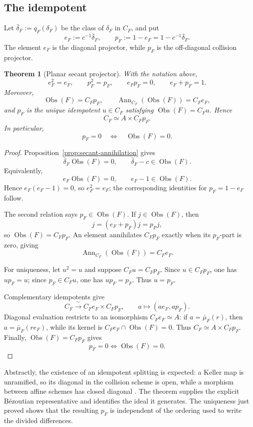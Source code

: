 \documentclass[11pt]{article}
\newtheorem{theorem}{Theorem}[section]
\newcommand{\Obs}{\operatorname{Obs}}
\begin{document}
\subsection{The idempotent}

Let \(\bar\delta_F:=q_F(\delta_F)\) be the class of \(\delta_F\) in
\(C_F\), and put
\[
  e_F:=c^{-1}\bar\delta_F,\qquad
  p_F:=1-e_F=1-c^{-1}\bar\delta_F.
\]
The element \(e_F\) is the diagonal projector, while \(p_F\) is the
off-diagonal collision projector.

\begin{theorem}[Planar secant projector]
\label{thm:planar-secant-projector}
With the notation above,
\[
  e_F^2=e_F,\qquad
  p_F^2=p_F,\qquad
  e_Fp_F=0,\qquad
  e_F+p_F=1.
\]
Moreover,
\[
  \Obs(F)=C_Fp_F,\qquad
  \operatorname{Ann}_{C_F}(\Obs(F))=C_Fe_F,
\]
and \(p_F\) is the unique idempotent \(u\in C_F\) satisfying
\(\Obs(F)=C_Fu\).  Hence
\[
  C_F\simeq A\times C_Fp_F.
\]
In particular,
\[
  p_F=0\quad\Longleftrightarrow\quad\Obs(F)=0.
\]
\end{theorem}

\begin{proof}
Proposition~\ref{prop:secant-annihilation} gives
\[
  \bar\delta_F\Obs(F)=0,\qquad
  \bar\delta_F-c\in\Obs(F).
\]
Equivalently,
\[
  e_F\Obs(F)=0,\qquad e_F-1\in\Obs(F).
\]
Hence \(e_F(e_F-1)=0\), so \(e_F^2=e_F\); the corresponding identities
for \(p_F=1-e_F\) follow.

The second relation says \(p_F\in\Obs(F)\).  If
\(j\in\Obs(F)\), then
\[
  j=(e_F+p_F)j=p_Fj,
\]
so \(\Obs(F)=C_Fp_F\).  An element annihilates \(C_Fp_F\) exactly when its
\(p_F\)-part is zero, giving
\[
  \operatorname{Ann}_{C_F}(\Obs(F))=C_Fe_F.
\]

For uniqueness, let \(u^2=u\) and suppose \(C_Fu=C_Fp_F\).  Since
\(u\in C_Fp_F\), one has \(up_F=u\); since \(p_F\in C_Fu\), one has
\(up_F=p_F\).  Thus \(u=p_F\).

Complementary idempotents give
\[
  C_F\xrightarrow{\ \sim\ }C_Fe_F\times C_Fp_F,\qquad
  a\longmapsto(ae_F,ap_F).
\]
Diagonal evaluation restricts to an isomorphism \(C_Fe_F\simeq A\):
if \(a=\bar\mu_F(r)\), then \(a=\bar\mu_F(re_F)\), while its kernel is
\(C_Fe_F\cap\Obs(F)=0\).  Thus \(C_F\simeq A\times C_Fp_F\).
Finally, \(\Obs(F)=C_Fp_F\) gives
\[
  p_F=0\Longleftrightarrow\Obs(F)=0.
\]
\end{proof}

Abstractly, the existence of an idempotent splitting is expected: a Keller
map is unramified, so its diagonal in the collision scheme is open, while a
morphism between affine schemes has closed diagonal
\cite{StacksUnramifiedDiagonalOpen,StacksAffineDiagonalClosed}.  The theorem
supplies the explicit B\'ezoutian representative and identifies the ideal it
generates.  The uniqueness just proved shows that the resulting \(p_F\) is
independent of the ordering used to write the divided differences.
\end{document}

